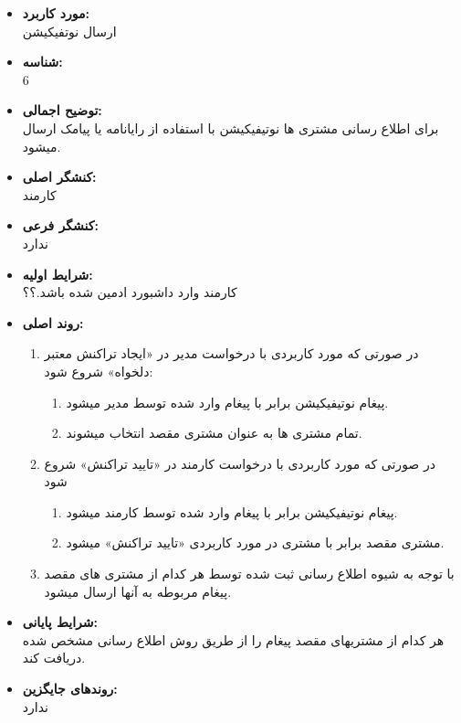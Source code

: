 \documentclass{article}
\begin{document}
\begin{itemize}
\item \textbf{مورد کاربرد:}\\
ارسال نوتفیکیشن
\item \textbf{شناسه:}\\
6
\item \textbf{توضیح اجمالی:}\\
برای اطلاع رسانی مشتری ها نوتیفیکیشن با استفاده از رایانامه یا پیامک ارسال میشود.
\item \textbf{کنشگر اصلی:}\\
کارمند
\item \textbf{کنشگر فرعی:}\\
ندارد
\item \textbf{شرایط اولیه:}\\
کارمند وارد داشبورد ادمین شده باشد.؟؟
\item \textbf{روند اصلی:}\\
\begin{enumerate}
\item در صورتی که مورد کاربردی با درخواست مدیر در «ایجاد تراکنش معتبر دلخواه» شروع شود: 
\begin{enumerate}
\item پیغام نوتیفیکیشن برابر با پیغام وارد شده توسط مدیر میشود.
\item تمام مشتری ها به عنوان مشتری مقصد انتخاب میشوند.
\end{enumerate}
\item در صورتی که مورد کاربردی با درخواست کارمند در «تایید تراکنش» شروع شود
\begin{enumerate}
\item پیغام نوتیفیکیشن برابر با پیغام وارد شده توسط کارمند میشود.
\item مشتری مقصد برابر با مشتری در مورد کاربردی «تایید تراکنش» میشود.
\end{enumerate}
\item با توجه به شیوه اطلاع رسانی ثبت شده توسط هر کدام از مشتری های مقصد پیغام مربوطه به آنها ارسال میشود.
\end{enumerate}

\item \textbf{شرایط پایانی:}\\ 
هر کدام از مشتریهای مقصد پیغام را از طریق روش اطلاع رسانی مشخص شده دریافت کند.
\item \textbf{روندهای جایگزین:}\\
ندارد
\end{itemize}
\noindent\makebox[\linewidth]{\rule{\paperwidth}{0.4pt}}
\end{document}
